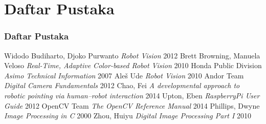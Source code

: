 \documentclass[table,dvipsnames]{beamer}
\begin{document}
%

\section{Daftar Pustaka}
% 
\begin{frame}
\frametitle{Daftar Pustaka}
\footnotesize{
\begin{thebibliography}{99}
 Widodo Budiharto, Djoko Purwanto \textit{Robot Vision} 2012
 Brett Browning, Manuela Veloso \textit{Real-Time, Adaptive Color-based Robot Vision} 2010
 Honda Public Division \textit{Asimo Technical Information} 2007
 Aleš Ude \textit{Robot Vision} 2010
 Andor Team \textit{Digital Camera Fundamentals} 2012
 Chao, Fei \textit{A developmental approach to robotic pointing via human–robot interaction} 2014
 Upton, Eben \textit{RaspberryPi User Guide} 2012
 OpenCV Team \textit{The OpenCV Reference Manual} 2014
 Phillips, Dwyne \textit{Image Processing in C} 2000
 Zhou, Huiyu \textit{Digital Image Processing Part I} 2010
\end{thebibliography}
}
\end{frame}
\end{document}
